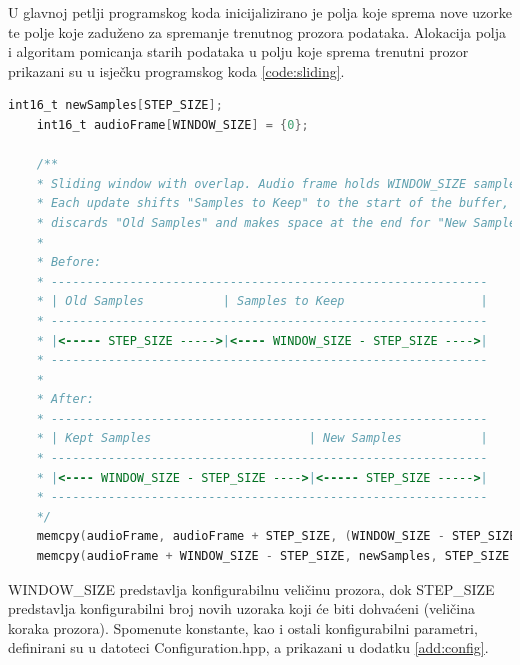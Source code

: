 U glavnoj petlji programskog koda inicijalizirano je polja koje sprema nove uzorke te 
polje koje zaduženo za spremanje trenutnog prozora podataka. Alokacija polja i algoritam
pomicanja starih podataka u polju koje sprema trenutni prozor prikazani su u isječku programskog
koda \ref{code:sliding}.

\begin{lstlisting}[language=C, caption=Sliding Window with Overlap, label=code:sliding]
    int16_t newSamples[STEP_SIZE];
    int16_t audioFrame[WINDOW_SIZE] = {0};
    
    /**
    * Sliding window with overlap. Audio frame holds WINDOW_SIZE samples.
    * Each update shifts "Samples to Keep" to the start of the buffer,
    * discards "Old Samples" and makes space at the end for "New Samples."
    *
    * Before:
    * -------------------------------------------------------------
    * | Old Samples           | Samples to Keep                   |
    * -------------------------------------------------------------
    * |<----- STEP_SIZE ----->|<---- WINDOW_SIZE - STEP_SIZE ---->|
    * -------------------------------------------------------------
    *
    * After:
    * -------------------------------------------------------------
    * | Kept Samples                      | New Samples           |
    * -------------------------------------------------------------
    * |<---- WINDOW_SIZE - STEP_SIZE ---->|<----- STEP_SIZE ----->|
    * -------------------------------------------------------------
    */
    memcpy(audioFrame, audioFrame + STEP_SIZE, (WINDOW_SIZE - STEP_SIZE) * 2);
    memcpy(audioFrame + WINDOW_SIZE - STEP_SIZE, newSamples, STEP_SIZE * 2);
\end{lstlisting}

WINDOW\_SIZE predstavlja konfigurabilnu veličinu prozora, dok STEP\_SIZE predstavlja 
konfigurabilni broj novih uzoraka koji će biti dohvaćeni (veličina koraka prozora).
Spomenute konstante, kao i ostali konfigurabilni parametri, definirani su u 
datoteci Configuration.hpp, a prikazani u dodatku \ref{add:config}.

